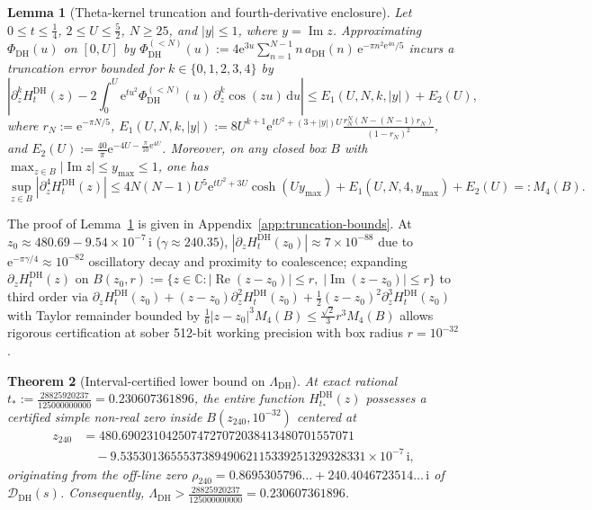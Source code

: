 \documentclass[11pt,a4paper,reqno]{amsart}
\newtheorem{theorem}{Theorem}[section]
\newtheorem{lemma}[theorem]{Lemma}
\theoremstyle{definition}
\theoremstyle{remark}
\numberwithin{equation}{section}
\newcommand{\C}{\mathbb{C}}
\newcommand{\dd}{\mathrm{d}}
\newcommand{\ii}{\mathrm{i}}
\newcommand{\ee}{\mathrm{e}}
\DeclareMathOperator{\Reop}{Re}
\DeclareMathOperator{\Imop}{Im}
\begin{document}
\begin{lemma}[Theta-kernel truncation and fourth-derivative enclosure]
\label{lem:theta-truncation}
Let $0 \le t \le \frac{1}{4}$, $2 \le U \le \frac{5}{2}$, $N \ge 25$, and $|y| \le 1$, where $y = \Imop z$. Approximating $\Phi_{\mathrm{DH}}(u)$ on $[0, U]$ by $\Phi_{\mathrm{DH}}^{(<N)}(u) := 4\ee^{3u}\sum_{n=1}^{N-1} n\,a_{\mathrm{DH}}(n)\,\ee^{-\pi n^2\ee^{4u}/5}$ incurs a truncation error bounded for $k \in \{0, 1, 2, 3, 4\}$ by
\begin{equation}
  \left|\partial_z^k H_t^{\mathrm{DH}}(z) - 2\int_{0}^{U} \ee^{tu^2}\Phi_{\mathrm{DH}}^{(<N)}(u)\,\partial_z^k\cos(zu)\,\dd u\right|
  \le E_1(U,N,k,|y|) + E_2(U),
  \label{eq:theta-tail-bound}
\end{equation}
where $r_N := \ee^{-\pi N/5}$, $E_1(U,N,k,|y|) := 8 U^{k+1}\ee^{t U^2 + (3+|y|)U}\frac{r_N^N(N - (N-1)r_N)}{(1 - r_N)^2}$, and $E_2(U) := \frac{40}{\pi}\ee^{-4U - \frac{\pi}{10}\ee^{4U}}$. Moreover, on any closed box $B$ with $\max_{z \in B}|\Imop z| \le y_{\max} \le 1$, one has
\begin{equation}
  \sup_{z \in B}\left|\partial_z^4 H_t^{\mathrm{DH}}(z)\right|
  \le 4N(N-1)U^5 \ee^{t U^2 + 3U}\cosh(U y_{\max}) + E_1(U,N,4,y_{\max}) + E_2(U)
  =: M_4(B).
  \label{eq:m4-bound}
\end{equation}
\end{lemma}

The proof of Lemma~\ref{lem:theta-truncation} is given in Appendix~\ref{app:truncation-bounds}. At $z_0 \approx 480.69 - 9.54 \times 10^{-7}\,\ii$ ($\gamma \approx 240.35$), $|\partial_z H_t^{\mathrm{DH}}(z_0)| \approx 7 \times 10^{-88}$ due to $\ee^{-\pi\gamma/4} \approx 10^{-82}$ oscillatory decay and proximity to coalescence; expanding $\partial_z H_t^{\mathrm{DH}}(z)$ on $B(z_0, r) := \{z \in \C : |\Reop(z - z_0)| \le r,\; |\Imop(z - z_0)| \le r\}$ to third order via $\partial_z H_t^{\mathrm{DH}}(z_0) + (z - z_0)\partial_z^2 H_t^{\mathrm{DH}}(z_0) + \frac{1}{2}(z - z_0)^2\partial_z^3 H_t^{\mathrm{DH}}(z_0)$ with Taylor remainder bounded by $\frac{1}{6}|z - z_0|^3 M_4(B) \le \frac{\sqrt{2}}{3}r^3 M_4(B)$ allows rigorous certification at sober 512-bit working precision with box radius $r = 10^{-32}$.

\begin{theorem}[Interval-certified lower bound on $\Lambda_{\mathrm{DH}}$]
\label{thm:certified-lower}
At exact rational $t_* := \frac{28825920237}{125000000000} = 0.230607361896$, the entire function $H_{t_*}^{\mathrm{DH}}(z)$ possesses a certified simple non-real zero inside $B(z_{240}, 10^{-32})$ centered at
\begin{equation}
  \begin{aligned}
    z_{240} &= 480.6902310425074727072038413480701557071 \\
    &\quad - 9.535301365553738949062115339251329328331 \times 10^{-7}\,\ii,
  \end{aligned}
  \label{eq:z240-center}
\end{equation}
originating from the off-line zero $\rho_{240} = 0.8695305796\ldots + 240.4046723514\ldots\,\ii$ of $\mathcal{D}_{\mathrm{DH}}(s)$. Consequently, $\Lambda_{\mathrm{DH}} > \frac{28825920237}{125000000000} = 0.230607361896$.
\end{theorem}
\end{document}
